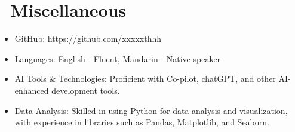 \documentclass{resume}
\begin{document}
\section{\faInfo\ Miscellaneous}
\begin{itemize}[parsep=0.5ex]
  \item GitHub: https://github.com/xxxxxthhh
  \item Languages: English - Fluent, Mandarin - Native speaker
  \item AI Tools \& Technologies: Proficient with Co-pilot, chatGPT, and other AI-enhanced development tools.
  \item Data Analysis: Skilled in using Python for data analysis and visualization, with experience in libraries such as Pandas, Matplotlib, and Seaborn.
\end{itemize}

%
%
\end{document}
